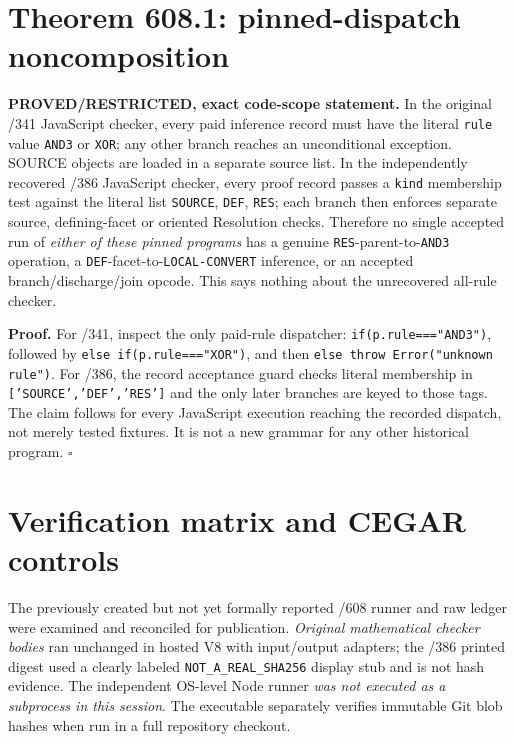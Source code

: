 \documentclass[11pt]{article}
\begin{document}
\section*{Theorem 608.1: pinned-dispatch noncomposition}
\textbf{PROVED/RESTRICTED, exact code-scope statement.} In the original /341 JavaScript checker, every paid inference record must have the literal \texttt{rule} value \texttt{AND3} or \texttt{XOR}; any other branch reaches an unconditional exception. SOURCE objects are loaded in a separate source list. In the independently recovered /386 JavaScript checker, every proof record passes a \texttt{kind} membership test against the literal list \texttt{SOURCE}, \texttt{DEF}, \texttt{RES}; each branch then enforces separate source, defining-facet or oriented Resolution checks. Therefore no single accepted run of \emph{either of these pinned programs} has a genuine \texttt{RES}-parent-to-\texttt{AND3} operation, a \texttt{DEF}-facet-to-\texttt{LOCAL-CONVERT} inference, or an accepted branch/discharge/join opcode. This says nothing about the unrecovered all-rule checker.

\textbf{Proof.} For /341, inspect the only paid-rule dispatcher: \texttt{if(p.rule==="AND3")}, followed by \texttt{else if(p.rule==="XOR")}, and then \texttt{else throw Error("unknown rule")}. For /386, the record acceptance guard checks literal membership in \texttt{['SOURCE','DEF','RES']} and the only later branches are keyed to those tags. The claim follows for every JavaScript execution reaching the recorded dispatch, not merely tested fixtures. It is not a new grammar for any other historical program. \(\square\)

\section*{Verification matrix and CEGAR controls}
The previously created but not yet formally reported /608 runner and raw ledger were examined and reconciled for publication. \emph{Original mathematical checker bodies} ran unchanged in hosted V8 with input/output adapters; the /386 printed digest used a clearly labeled \texttt{NOT\_A\_REAL\_SHA256} display stub and is not hash evidence. The independent OS-level Node runner \emph{was not executed as a subprocess in this session}. The executable separately verifies immutable Git blob hashes when run in a full repository checkout.
\end{document}
